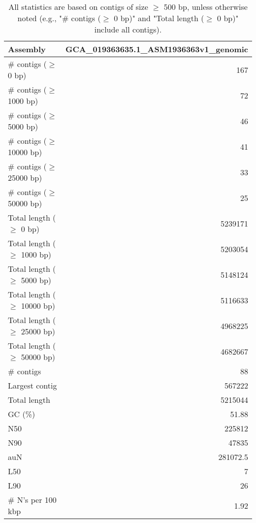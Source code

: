 \documentclass[12pt,a4paper]{article}
\begin{document}
\begin{table}[ht]
\begin{center}
\caption{All statistics are based on contigs of size $\geq$ 500 bp, unless otherwise noted (e.g., "\# contigs ($\geq$ 0 bp)" and "Total length ($\geq$ 0 bp)" include all contigs).}
\begin{tabular}{|l*{1}{|r}|}
\hline
Assembly & GCA\_019363635.1\_ASM1936363v1\_genomic \\ \hline
\# contigs ($\geq$ 0 bp) & 167 \\ \hline
\# contigs ($\geq$ 1000 bp) & 72 \\ \hline
\# contigs ($\geq$ 5000 bp) & 46 \\ \hline
\# contigs ($\geq$ 10000 bp) & 41 \\ \hline
\# contigs ($\geq$ 25000 bp) & 33 \\ \hline
\# contigs ($\geq$ 50000 bp) & 25 \\ \hline
Total length ($\geq$ 0 bp) & 5239171 \\ \hline
Total length ($\geq$ 1000 bp) & 5203054 \\ \hline
Total length ($\geq$ 5000 bp) & 5148124 \\ \hline
Total length ($\geq$ 10000 bp) & 5116633 \\ \hline
Total length ($\geq$ 25000 bp) & 4968225 \\ \hline
Total length ($\geq$ 50000 bp) & 4682667 \\ \hline
\# contigs & 88 \\ \hline
Largest contig & 567222 \\ \hline
Total length & 5215044 \\ \hline
GC (\%) & 51.88 \\ \hline
N50 & 225812 \\ \hline
N90 & 47835 \\ \hline
auN & 281072.5 \\ \hline
L50 & 7 \\ \hline
L90 & 26 \\ \hline
\# N's per 100 kbp & 1.92 \\ \hline
\end{tabular}
\end{center}
\end{table}
\end{document}
